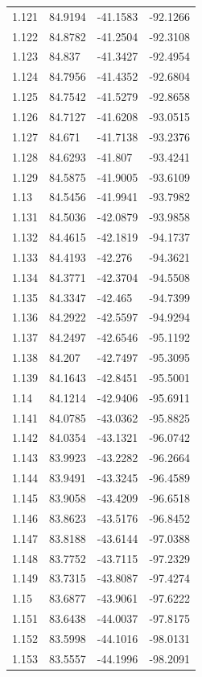 \begin{tabular}{llll}
1.121 & 84.9194 & -41.1583 & -92.1266 \\
1.122 & 84.8782 & -41.2504 & -92.3108 \\
1.123 & 84.837 & -41.3427 & -92.4954 \\
1.124 & 84.7956 & -41.4352 & -92.6804 \\
1.125 & 84.7542 & -41.5279 & -92.8658 \\
1.126 & 84.7127 & -41.6208 & -93.0515 \\
1.127 & 84.671 & -41.7138 & -93.2376 \\
1.128 & 84.6293 & -41.807 & -93.4241 \\
1.129 & 84.5875 & -41.9005 & -93.6109 \\
1.13 & 84.5456 & -41.9941 & -93.7982 \\
1.131 & 84.5036 & -42.0879 & -93.9858 \\
1.132 & 84.4615 & -42.1819 & -94.1737 \\
1.133 & 84.4193 & -42.276 & -94.3621 \\
1.134 & 84.3771 & -42.3704 & -94.5508 \\
1.135 & 84.3347 & -42.465 & -94.7399 \\
1.136 & 84.2922 & -42.5597 & -94.9294 \\
1.137 & 84.2497 & -42.6546 & -95.1192 \\
1.138 & 84.207 & -42.7497 & -95.3095 \\
1.139 & 84.1643 & -42.8451 & -95.5001 \\
1.14 & 84.1214 & -42.9406 & -95.6911 \\
1.141 & 84.0785 & -43.0362 & -95.8825 \\
1.142 & 84.0354 & -43.1321 & -96.0742 \\
1.143 & 83.9923 & -43.2282 & -96.2664 \\
1.144 & 83.9491 & -43.3245 & -96.4589 \\
1.145 & 83.9058 & -43.4209 & -96.6518 \\
1.146 & 83.8623 & -43.5176 & -96.8452 \\
1.147 & 83.8188 & -43.6144 & -97.0388 \\
1.148 & 83.7752 & -43.7115 & -97.2329 \\
1.149 & 83.7315 & -43.8087 & -97.4274 \\
1.15 & 83.6877 & -43.9061 & -97.6222 \\
1.151 & 83.6438 & -44.0037 & -97.8175 \\
1.152 & 83.5998 & -44.1016 & -98.0131 \\
1.153 & 83.5557 & -44.1996 & -98.2091 \\

\end{tabular}
